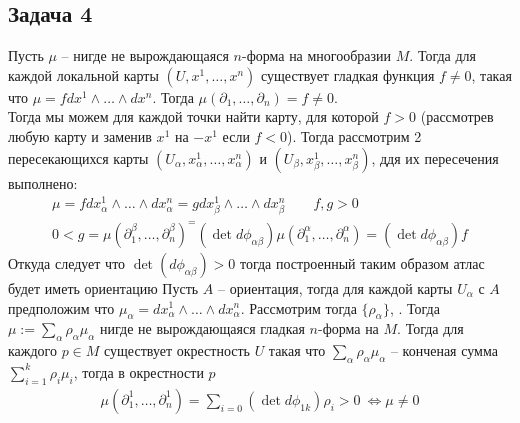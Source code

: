 \subsection*{Задача 4}
	Пусть $\mu$ -- нигде не вырождающаяся $n$-форма на многообразии $M$. Тогда для каждой локальной карты $(U,x^{1},\ldots,x^{n})$ существует гладкая функция $f \ne 0$, такая что $\mu = fdx^{1} \wedge \ldots \wedge dx^{n}$. Тогда $\mu(\partial_1,\ldots,\partial_n) = f \ne 0$.\\
	Тогда мы можем для каждой точки найти карту, для которой $f > 0$ (рассмотрев любую карту и заменив $x^{1}$ на $-x^{1}$ если $f < 0$). Тогда рассмотрим 2 пересекающихся карты $(U_{\alpha},x^{1}_{\alpha},\ldots,x^{n}_{\alpha})$ и $(U_{\beta},x^{1}_{\beta},\ldots,x^{n}_{\beta})$, ддя их пересечения выполнено:
	\begin{gather*}
		\mu = f dx^{1}_{\alpha} \wedge \ldots \wedge dx^{n}_{\alpha} = gdx^{1}_{\beta} \wedge \ldots \wedge dx^{n}_{\beta}\qquad f,g > 0\\
		0 < g = \mu(\partial_1^{\beta},\ldots,\partial_n^{\beta})^= (\det d\phi_{\alpha \beta}) \mu(\partial_1^{\alpha},\ldots,\partial_n^{\alpha}) = (\det d\phi_{\alpha \beta})f
	\end{gather*}
	Откуда следует что $\det(d\phi_{\alpha \beta}) > 0$ тогда построенный таким образом атлас будет иметь ориентацию
	\vskip 0.2in
	Пусть $A$ -- ориентация, тогда для каждой карты $U_{\alpha}$ с $A$ предположим что $\mu_{\alpha} = dx^{1}_{\alpha} \wedge \ldots \wedge dx^{n}_{\alpha}$. Рассмотрим тогда $\{\rho_{\alpha}\}$, . Тогда $\mu := \sum\limits_{\alpha} \rho_{\alpha} \mu_{\alpha}$ нигде не вырождающаяся гладкая $n$-форма на $M$. Тогда для каждого $p \in M$ существует окрестность $U$ такая что $\sum\limits_{\alpha} \rho_{\alpha} \mu_{\alpha}$ -- конченая сумма $\sum\limits_{i = 1}^{k} \rho_{i} \mu_{i}$, тогда в окрестности $p$
	\begin{gather*}
		\mu(\partial_1^1,\ldots,\partial_n^{1}) = \sum\limits_{i = 0}(\det d \phi_{1k})\rho_{i} > 0\ \Leftrightarrow \mu \ne 0
	\end{gather*}
\vskip 0.4in %


